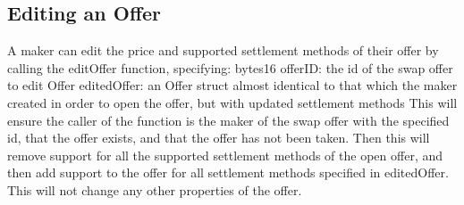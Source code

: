 \documentclass[11pt]{article}
\begin{document}
    \subsection*{Editing an Offer}

    A maker can edit the price and supported settlement methods of their offer by calling the editOffer function,
    specifying:
    bytes16 offerID: the id of the swap offer to edit
    Offer editedOffer: an Offer struct almost identical to that which the maker created in order to open the offer, but with
    updated settlement methods
    This will ensure the caller of the function is the maker of the swap offer with the specified id, that the offer exists,
    and that the offer has not been taken. Then this will remove support for all the supported settlement methods of the
    open offer, and then add support to the offer for all settlement methods specified in editedOffer. This will not change
    any other properties of the offer.
\end{document}
